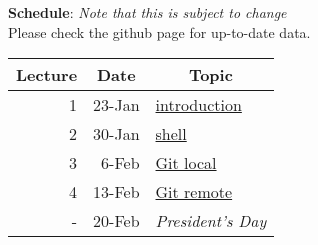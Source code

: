 \documentclass[12pt]{article}
\begin{document}
\clearpage
\noindent\textbf{Schedule}: \textit{Note that this is subject to change}\\
Please check the github page for up-to-date data.
\begin{table}[htbp]
\begin{tabular}{|r|r|l|}
\hline
\multicolumn{1}{|c|}{Lecture} & \multicolumn{1}{c|}{Date} & \multicolumn{1}{c|}{Topic} \\ \hline
1  & 23-Jan & \href{http://rachelslaybaugh.github.io/ne24intro/#/}{introduction} \\ \hline
2  & 30-Jan & \href{http://bids.github.io/2016-01-14-berkeley/shell/}{shell} \\ \hline
3  & 6-Feb  & \href{http://bids.github.io/2016-01-14-berkeley/git/}{Git local} \\ \hline
4  & 13-Feb & \href{http://bids.github.io/2016-01-14-berkeley/git/}{Git remote} \\ \hline
-  & 20-Feb & \textit{President's Day} \\ \hline


\end{tabular}
\end{table}
\end{document}
